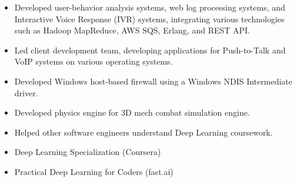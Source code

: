 \documentclass[10pt,a4paper,ragged2e,withhyper]{altacv}
\begin{document}
\divider

\begin{itemize}
  \item Developed user-behavior analysis systems, web log processing systems, and Interactive Voice Response (IVR) systems, integrating various technologies such as Hadoop MapReduce, AWS SQS, Erlang, and REST API.
\end{itemize}

\divider

\begin{itemize}
  \item Led client development team, developing applications for Push-to-Talk and VoIP systems on various operating systems.
\end{itemize}

\divider

\begin{itemize}
  \item Developed Windows host-based firewall using a Windows NDIS Intermediate driver.
\end{itemize}

\divider

\begin{itemize}
  \item Developed physics engine for 3D mech combat simulation engine.
\end{itemize}


\bigskip
{}

\begin{itemize}
  \item Helped other software engineers understand Deep Learning coursework.
  \item Deep Learning Specialization (Coursera)
  \item Practical Deep Learning for Coders (fast.ai)
\end{itemize}


\bigskip
{}



\bigskip
{}

\end{document}
